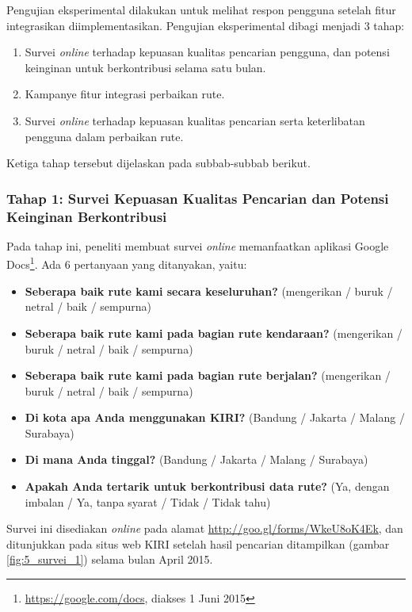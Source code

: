 Pengujian eksperimental dilakukan untuk melihat respon pengguna setelah fitur integrasikan diimplementasikan. Pengujian eksperimental dibagi menjadi 3 tahap:

\begin{enumerate}
	\item Survei \textit{online} terhadap kepuasan kualitas pencarian pengguna, dan potensi keinginan untuk berkontribusi selama satu bulan.
	\item Kampanye fitur integrasi perbaikan rute.
	\item Survei \textit{online} terhadap kepuasan kualitas pencarian serta keterlibatan pengguna dalam perbaikan rute.
\end{enumerate}

Ketiga tahap tersebut dijelaskan pada subbab-subbab berikut.

\subsubsection{Tahap 1: Survei Kepuasan Kualitas Pencarian dan Potensi Keinginan Berkontribusi}

Pada tahap ini, peneliti membuat survei \textit{online} memanfaatkan aplikasi Google Docs\footnote{\url{https://google.com/docs}, diakses 1 Juni 2015}. Ada 6 pertanyaan yang ditanyakan, yaitu:

\begin{itemize}
	\item \textbf{Seberapa baik rute kami secara keseluruhan?} (mengerikan / buruk / netral / baik / sempurna)
	\item \textbf{Seberapa baik rute kami pada bagian rute kendaraan?} (mengerikan / buruk / netral / baik / sempurna)
	\item \textbf{Seberapa baik rute kami pada bagian rute berjalan?} (mengerikan / buruk / netral / baik / sempurna)
	\item \textbf{Di kota apa Anda menggunakan KIRI?} (Bandung / Jakarta / Malang / Surabaya)
	\item \textbf{Di mana Anda tinggal?} (Bandung / Jakarta / Malang / Surabaya)
	\item \textbf{Apakah Anda tertarik untuk berkontribusi data rute?} (Ya, dengan imbalan / Ya, tanpa syarat / Tidak / Tidak tahu)
\end{itemize}

Survei ini disediakan \textit{online} pada alamat \url{http://goo.gl/forms/WkeU8oK4Ek}, dan ditunjukkan pada situs web KIRI setelah hasil pencarian ditampilkan (gambar \ref{fig:5_survei_1}) selama bulan April 2015.

